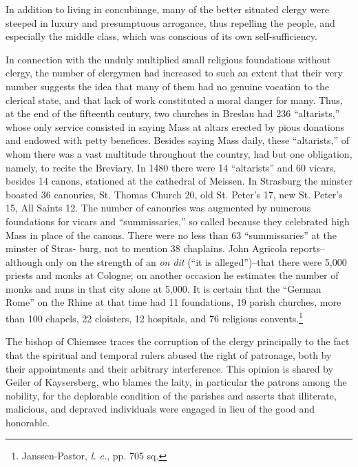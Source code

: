 In addition to living in concubinage, many of the better situated
clergy were steeped in luxury and presumptuous arrogance, thus repelling
the people, and especially the middle class, which was conscious
of its own self-sufficiency.

In connection with the unduly multiplied small religious foundations without
clergy, the number of clergymen had increased to
such an extent that their very number suggests the idea that many
of them had no genuine vocation to the clerical state, and that lack
of work constituted a moral danger for many. Thus, at the end
of the fifteenth century, two churches in Breslau had 236 “altarists,”
whose only service consisted in saying Mass at altars erected by pious
donations and endowed with petty benefices. Besides saying Mass
daily, these “altarists,” of whom there was a vast multitude throughout
the country, had but one obligation, namely, to recite the Breviary. In
1480 there were 14 “altarists” and 60 vicars, besides 14
canons, stationed at the cathedral of Meissen. In Strasburg the
minster boasted 36 canonries, St. Thomas Church 20, old St. Peter’s
17, new St. Peter’s 15, All Saints 12. The number of canonries was
augmented by numerous foundations for vicars and “summissaries,”
so called because they celebrated high Mass in place of the canons.
There were no less than 63 “summissaries” at the minster of Stras-
burg, not to mention 38 chaplains. John Agricola reports--although only
on the strength of an \textit{on dit} (“it is alleged”)--that
there were 5,000 priests and monks at Cologne; on another occasion
he estimates the number of monks and nuns in that city alone at
5,000. It is certain that the “German Rome” on the Rhine at that time
had 11 foundations, 19 parish churches, more than 100 chapels, 22
cloisters, 12 hospitals, and 76 religious convents.\footnote{Janssen-Pastor, \textit{l. c.}, pp. 705 sq.}

The bishop of Chiemsee traces the corruption of the clergy principally
to the fact that the spiritual and temporal rulers abused the
right of patronage, both by their appointments and their arbitrary
interference. This opinion is shared by Geiler of Kaysersberg, who
blames the laity, in particular the patrons among the nobility, for
the deplorable condition of the parishes and asserts that illiterate,
malicious, and depraved individuals were engaged in lieu of the good
and honorable.

